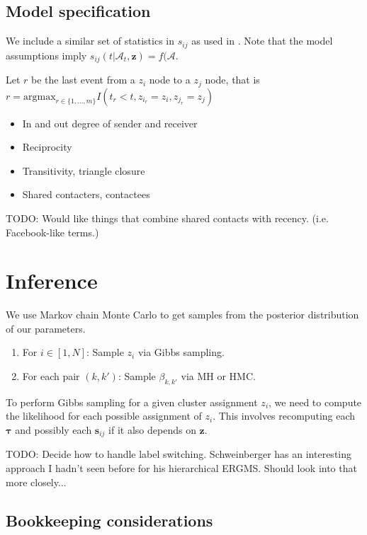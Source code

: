 \documentclass[11pt]{article}
\begin{document}
\subsection{Model specification}

We include a similar set of statistics in $s_{ij}$ as used in \cite{Butts2008,Vuy2011}.
Note that the model assumptions imply $s_{ij}(t|\mathcal{A}_t,\mathbf{z}) = f(\mathcal{A}$.

Let $r$ be the last event from a $z_i$ node to a $z_j$ node, that is $r = \mbox{argmax}_{r \in \{1, \ldots, m\}}I(t_r < t, z_{i_r} = z_i, z_{j_r} = z_j)$

\begin{itemize}
\item In and out degree of sender and receiver
\item Reciprocity
\item Transitivity, triangle closure
\item Shared contacters, contactees
\end{itemize}

TODO: Would like things that combine shared contacts with recency. (i.e. Facebook-like terms.) 

\section{Inference}

We use Markov chain Monte Carlo to get samples from the posterior distribution of our parameters.  

\begin{enumerate}
\item For $i \in [1,N]$: Sample $z_i$ via Gibbs sampling.
\item For each pair $(k,k')$: Sample $\beta_{k,k'}$ via MH or HMC.
\end{enumerate}

To perform Gibbs sampling for a given cluster assignment $z_i$, we need to compute the likelihood for each possible assignment of $z_i$.  This involves recomputing each $\boldsymbol{\tau}$ and possibly each $\mathbf{s}_{ij}$ if it also depends on $\mathbf{z}$.

TODO: Decide how to handle label switching.  Schweinberger has an interesting approach I hadn't seen before for his hierarchical ERGMS.  Should look into that more closely...

\subsection*{Bookkeeping considerations}
\end{document}
